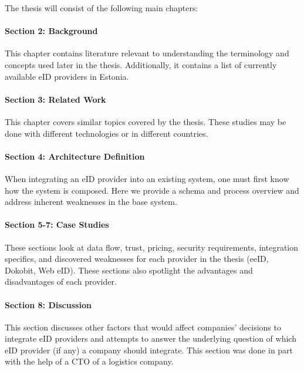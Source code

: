 The thesis will consist of the following main chapters:

\paragraph{Section 2: Background} This chapter contains literature relevant to understanding the terminology and concepts used later in the thesis. Additionally, it contains a list of currently available eID providers in Estonia.
\paragraph{Section 3: Related Work} This chapter covers similar topics covered by the thesis. These studies may be done with different technologies or in different countries.
\paragraph{Section 4: Architecture Definition} When integrating an eID provider into an existing system, one must first know how the system is composed. Here we provide a schema and process overview and address inherent weaknesses in the base system.
\paragraph{Section 5-7: Case Studies} These sections look at data flow, trust, pricing, security requirements, integration specifics, and discovered weaknesses for each provider in the thesis (eeID, Dokobit, Web eID). These sections also spotlight the advantages and disadvantages of each provider.
\paragraph{Section 8: Discussion} This section discusses other factors that would affect companies' decisions to integrate eID providers and attempts to answer the underlying question of which eID provider (if any) a company should integrate. This section was done in part with the help of a CTO of a logistics company.